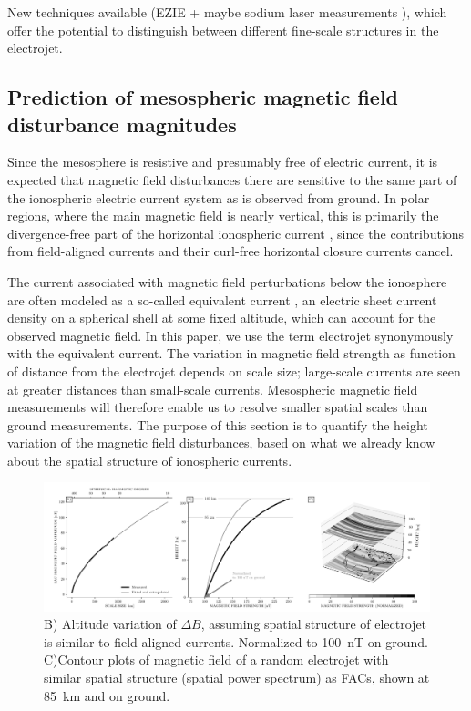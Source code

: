 \documentclass[draft]{agujournal2019}
\begin{document}
New techniques available (EZIE \cite{Yee20}+ maybe sodium laser measurements \cite{Kane18} ), which offer the potential to distinguish between different fine-scale structures in the electrojet. 

\subsection{Prediction of mesospheric magnetic field disturbance magnitudes}
Since the mesosphere is resistive and presumably free of electric current, it is expected that magnetic field disturbances there are sensitive to the same part of the ionospheric electric current system as is observed from ground. In polar regions, where the main magnetic field is nearly vertical, this is primarily the divergence-free part of the horizontal ionospheric current \cite{Fukushima76,Untiedt93,Laundal15}, since the contributions from field-aligned currents and their curl-free horizontal closure currents cancel. 

The current associated with magnetic field perturbations below the ionosphere are often modeled as a so-called equivalent current \cite{Kamide81}, an electric sheet current density on a spherical shell at some fixed altitude, which can account for the observed magnetic field. In this paper, we use the term electrojet synonymously with the equivalent current. The variation in magnetic field strength as function of distance from the electrojet depends on scale size; large-scale currents are seen at greater distances than small-scale currents. Mesospheric magnetic field measurements will therefore enable us to resolve smaller spatial scales than ground measurements. The purpose of this section is to quantify the height variation of the magnetic field disturbances, based on what we already know about the spatial structure of ionospheric currents. 

\begin{figure}
\includegraphics[width=\linewidth]{figures/radial_dependence.pdf}
\caption{B) Altitude variation of $\Delta B$, assuming spatial structure of electrojet is similar to field-aligned currents. Normalized to 100~nT on ground. C)Contour plots of magnetic field of a random electrojet with similar spatial structure (spatial power spectrum) as FACs, shown at 85~km and on ground. }
\label{fig:radial_dependence}
\end{figure}
\end{document}
